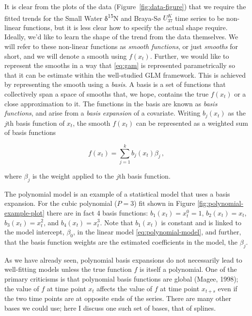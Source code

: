 \documentclass[12pt,]{article}
\newcommand{\uk}{\ensuremath{\mathit{U}^{\mathit{K}}_{\mathup{37}}}}
\begin{document}
It is clear from the plots of the data (Figure~\ref{fig:data-figure})
that we require the fitted trends for the Small Water
δ\textsuperscript{15}N and Braya-Sø \uk{} time series to be non-linear
functions, but it is less clear how to specify the actual shape require.
Ideally, we'd like to learn the shape of the trend from the data
themselves. We will refer to these non-linear functions as \emph{smooth
functions}, or just \emph{smooths} for short, and we will denote a
smooth using \(f(x_t)\). Further, we would like to represent the smooths
in a way that \eqref{eq:gam} is represented parametrically so that it
can be estimate within the well-studied GLM framework. This is achieved
by representing the smooth using a \emph{basis}. A basis is a set of
functions that collectively span a space of smooths that, we hope,
contains the true \(f(x_t)\) or a close approximation to it. The
functions in the basis are known as \emph{basis functions}, and arise
from a \emph{basis expansion} of a covariate. Writing \(b_j(x_t)\) as
the \(j\)th basis function of \(x_t\), the smooth \(f(x_t)\) can be
represented as a weighted sum of basis functions

\begin{equation*}
f(x_t) = \sum_{j = 1}^{k} b_j(x_t) \beta_j \,,
\end{equation*}

where \(\beta_j\) is the weight applied to the \(j\)th basis function.

The polynomial model is an example of a statistical model that uses a
basis expansion. For the cubic polynomial (\(P = 3\)) fit shown in
Figure \ref{fig:polynomial-example-plot} there are in fact 4 basis
functions: \(b_1(x_t) = x_t^0 = 1\), \(b_2(x_t) = x_t\),
\(b_3(x_t) = x^2_t\), and \(b_4(x_t) = x_t^3\). Note that \(b_1(x_t)\)
is constant and is linked to the model intercept, \(\beta_0\), in the
linear model \eqref{eq:polynomial-model}, and further, that the basis
function weights are the estimated coefficients in the model, the
\(\beta_j\).

As we have already seen, polynomial basis expansions do not necessarily
lead to well-fitting models unless the true function \(f\) is itself a
polynomial. One of the primary criticisms is that polynomial basis
functions are global (Magee, 1998); the value of \(f\) at time point
\(x_t\) affects the value of \(f\) at time point \(x_{t+s}\) even if the
two time points are at opposite ends of the series. There are many other
bases we could use; here I discuss one such set of bases, that of
splines.
\end{document}
